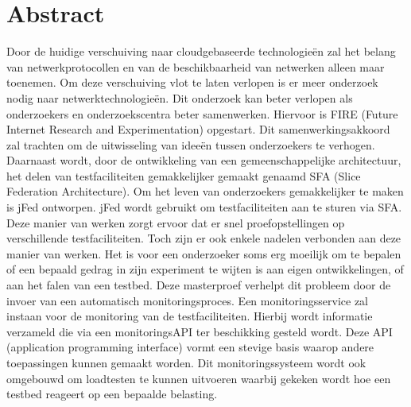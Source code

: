 \newpage
\chapter*{Abstract}
\npar
Door de huidige verschuiving naar cloudgebaseerde technologie\"en zal het belang 
van netwerkprotocollen en van de beschikbaarheid van netwerken alleen maar toenemen.
Om deze verschuiving vlot te laten verlopen is er meer onderzoek nodig naar netwerktechnologie\"en. Dit onderzoek kan beter verlopen als onderzoekers en onderzoekscentra beter samenwerken. Hiervoor is FIRE (Future Internet Research and Experimentation) opgestart. Dit samenwerkingsakkoord zal trachten om de uitwisseling van idee\"en tussen onderzoekers te verhogen.
\npar
Daarnaast wordt, door de ontwikkeling van een gemeenschappelijke architectuur,  het delen van testfaciliteiten gemakkelijker gemaakt genaamd SFA (Slice Federation Architecture). Om het leven van onderzoekers gemakkelijker te maken is jFed ontworpen. jFed wordt gebruikt om testfaciliteiten aan te sturen via SFA. Deze manier van werken zorgt ervoor dat er snel proefopstellingen op verschillende testfaciliteiten. Toch zijn er ook enkele nadelen verbonden aan deze manier van werken. Het is voor een onderzoeker soms erg moeilijk om te bepalen of een bepaald gedrag in zijn experiment te wijten is aan eigen ontwikkelingen, of aan het falen van een testbed.
\npar
Deze masterproef verhelpt dit probleem door de invoer van een automatisch monitoringsproces. Een monitoringsservice zal instaan voor de monitoring van de testfaciliteiten. Hierbij wordt informatie verzameld die via een monitoringsAPI ter beschikking gesteld wordt. Deze API (application programming interface) vormt een stevige basis waarop andere toepassingen kunnen gemaakt worden.
\npar
Dit monitoringssysteem wordt ook omgebouwd om loadtesten te kunnen uitvoeren waarbij gekeken wordt hoe een testbed reageert op een bepaalde belasting.